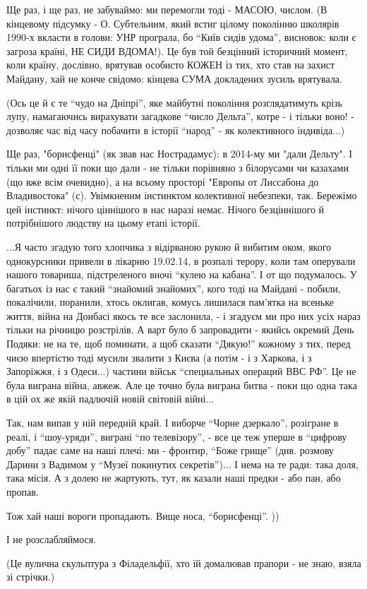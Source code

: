Ще раз, і ще раз, не забуваймо: ми перемогли тоді - МАСОЮ, числом. (В кінцевому
підсумку - О. Субтельним, який встиг цілому поколінню школярів 1990-х вкласти в
голови: УНР програла, бо \enquote{Київ сидів удома}, висновок: коли є загроза країні,
НЕ СИДИ ВДОМА!). Це був той безцінний історичний момент, коли країну, дослівно,
врятував особисто КОЖЕН із тих, хто став на захист Майдану, хай не конче
свідомо: кінцева СУМА докладених зусиль врятувала. 

(Ось це й є те \enquote{чудо на Дніпрі}, яке майбутні покоління розглядатимуть крізь
лупу, намагаючись вирахувати загадкове \enquote{число Дельта}, котре - і тільки воно! -
дозволяє час від часу побачити в історії \enquote{народ} - як колективного індивіда...)

Ще раз, "борисфенці" (як звав нас Нострадамус): в 2014-му ми "дали Дельту". І
тільки ми одні її поки що дали - не тільки порівняно з білорусами чи казахами
(що вже всім очевидно), а на всьому просторі "Европы от Лиссабона до
Владивостока" (с). Увімкненим інстинктом колективної небезпеки, так. Бережімо
цей інстинкт: нічого ціннішого в нас наразі немає. Нічого безціннішого й
потрібнішого людству на цьому етапі історії.  

...Я часто згадую того хлопчика з відірваною рукою й вибитим оком, якого
однокурсники привели в лікарню 19.02.14, в розпалі терору, коли там оперували
нашого товариша, підстреленого вночі \enquote{кулею на кабана}. І от що подумалось. У
багатьох із нас є такий \enquote{знайомий знайомих}, кого тоді на Майдані - побили,
покалічили, поранили, хтось оклигав, комусь лишилася пам'ятка на всеньке життя,
війна на Донбасі якось те все заслонила, - і згадуєм ми про них усіх нараз
тільки на річницю розстрілів. А варт було б запровадити - якийсь окремий День
Подяки: не на те, щоб поминати, а щоб сказати \enquote{Дякую!} кожному з тих, перед
чиєю впертістю тоді мусили звалити з Києва (а потім - і з Харкова, і з
Запоріжжя, і з Одеси...) частини військ \enquote{специальных операций ВВС РФ}. Це не
була виграна війна, авжеж. Але це точно була виграна битва - поки що одна така
в цій ох же якій падлючій новій світовій війні...

Так, нам випав у ній передній край. І виборче \enquote{Чорне дзеркало}, розігране в
реалі, і \enquote{шоу-уряди}, виграні \enquote{по телевізору}, - все це теж уперше в \enquote{цифрову
добу} падає саме на наші плечі: ми - фронтир, \enquote{Боже грище} (див. розмову Дарини
з Вадимом у \enquote{Музеї покинутих секретів})... І нема на те ради: така доля, така
місія. А з долею не жартують, тут, як казали наші предки - або пан, або пропав. 

Тож хай наші вороги пропадають. Вище носа, \enquote{борисфенці}. ))

І не розслабляймося. 


(Це вулична скульптура з Філадельфії, хто їй домалював прапори - не знаю, взяла
зі стрічки.)
